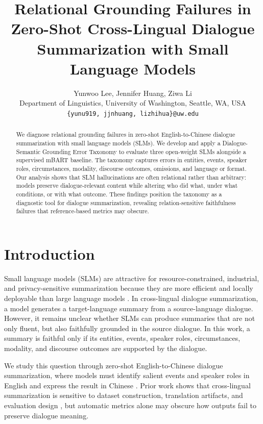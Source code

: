 \documentclass[11pt]{article}
\title{Relational Grounding Failures in Zero-Shot Cross-Lingual Dialogue Summarization with Small Language Models}
\author{
Yunwoo Lee, Jennifer Huang, Ziwa Li \\
Department of Linguistics, University of Washington, Seattle, WA, USA \\
\texttt{\{yunu919, jjnhuang, lizhihua\}@uw.edu}
}
\begin{document}
\maketitle
\raggedbottom
\begin{abstract}
We diagnose relational grounding failures in zero-shot English-to-Chinese dialogue summarization with small language models (SLMs). We develop and apply a Dialogue-Semantic Grounding Error Taxonomy to evaluate three open-weight SLMs alongside a supervised mBART baseline. The taxonomy captures errors in entities, events, speaker roles, circumstances, modality, discourse outcomes, omissions, and language or format. Our analysis shows that SLM hallucinations are often relational rather than arbitrary: models preserve dialogue-relevant content while altering who did what, under what conditions, or with what outcome. These findings position the taxonomy as a diagnostic tool for dialogue summarization, revealing relation-sensitive faithfulness failures that reference-based metrics may obscure.
\end{abstract}

\section{Introduction}
Small language models (SLMs) are attractive for resource-constrained, industrial, and privacy-sensitive summarization because they are more efficient and locally deployable than large language models \citep{abrougui-etal-2026-small,xu-etal-2025-evaluating,philippy-etal-2025-enhancing}. In cross-lingual dialogue summarization, a model generates a target-language summary from a source-language dialogue. However, it remains unclear whether SLMs can produce summaries that are not only fluent, but also faithfully grounded in the source dialogue. In this work, a summary is faithful only if its entities, events, speaker roles, circumstances, modality, and discourse outcomes are supported by the dialogue.

We study this question through zero-shot English-to-Chinese dialogue summarization, where models must identify salient events and speaker roles in English and express the result in Chinese \citep{wang-etal-2022-clidsum,wang-etal-2023-zero}. Prior work shows that cross-lingual summarization is sensitive to dataset construction, translation artifacts, and evaluation design \citep{bhattacharjee-etal-2023-crosssum,wang-etal-2023-understanding}, but automatic metrics alone may obscure how outputs fail to preserve dialogue meaning.
\end{document}
